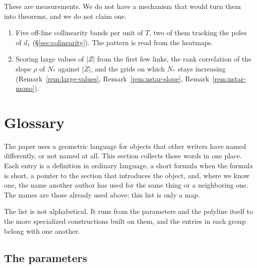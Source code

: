 \documentclass[11pt]{article}
\theoremstyle{definition}
\begin{document}
These are measurements. We do not have a mechanism that would turn them
into theorems, and we do not claim one.

\begin{enumerate}
\item
Five off-line collinearity bands per unit of $T$, two of them tracking
the poles of $d_1$
(\S\ref{sec:colinearity}).
The pattern is read from the heatmaps.

\item
Scoring large values of $|Z|$ from the first few links, the rank
correlation of the slope $\rho$ of $N_{\ast}$ against $|Z|$, and the
grids on which $N_{\ast}$ stays increasing
(Remark~\ref{rem:large-values}, Remark~\ref{rem:nstar-slope},
Remark~\ref{rem:nstar-mono}).
\end{enumerate}

\clearpage

\section{Glossary}\label{sec:glossary}

The paper uses a geometric language for objects that other writers have
named differently, or not named at all. This section collects those words
in one place. Each entry is a definition in ordinary language, a short
formula when the formula is short, a pointer to the section that
introduces the object, and, where we know one, the name another author
has used for the same thing or a neighboring one. The names are those
already used above; this list is only a map.

The list is not alphabetical. It runs from the parameters and the
polyline itself to the more specialized constructions built on them,
and the entries in each group belong with one another.

\subsection*{The parameters}
\end{document}
